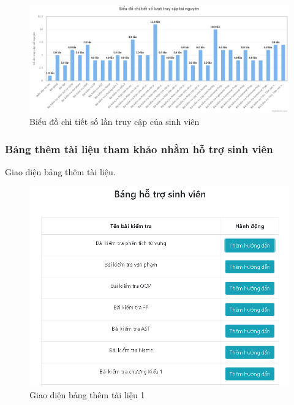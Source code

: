 \begin{center}
	\begin{figure}[htp]
		\begin{center}
			\includegraphics[width=1\linewidth]{img/42}
		\end{center}
		\caption{Biểu đồ chi tiết số lần truy cập của sinh viên}
		\label{refhinh69}
	\end{figure}
\end{center}

\newpage
\subsubsection*{Bảng thêm tài liệu tham khảo nhằm hỗ trợ sinh viên}

Giao diện bảng thêm tài liệu.

\begin{center}
	\begin{figure}[htp]
		\begin{center}
			\includegraphics[width=0.6\linewidth]{img/30}
		\end{center}
		\caption{Giao diện bảng thêm tài liệu 1}
		\label{refhinh62}
	\end{figure}
\end{center}

